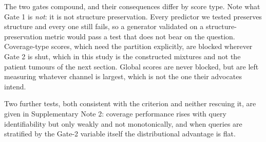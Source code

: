 \documentclass[11pt,letterpaper]{article}
\begin{document}
The two gates compound, and their consequences differ by score type. Note what Gate 1 is
\emph{not}: it is not structure preservation. Every predictor we tested preserves structure and
every one still fails, so a generator validated on a structure-preservation metric would pass a
test that does not bear on the question. Coverage-type scores, which need the partition explicitly,
are blocked wherever Gate 2 is shut, which in this study is the constructed mixtures and not the
patient tumours of the next section. Global scores are never blocked, but are left measuring
whatever channel is largest, which is not the one their advocates intend.

Two further tests, both consistent with the criterion and neither rescuing it, are given in
Supplementary Note 2: coverage performance rises with query identifiability but only weakly and
not monotonically, and when queries are stratified by the Gate-2 variable itself the
distributional advantage is flat.
\end{document}
